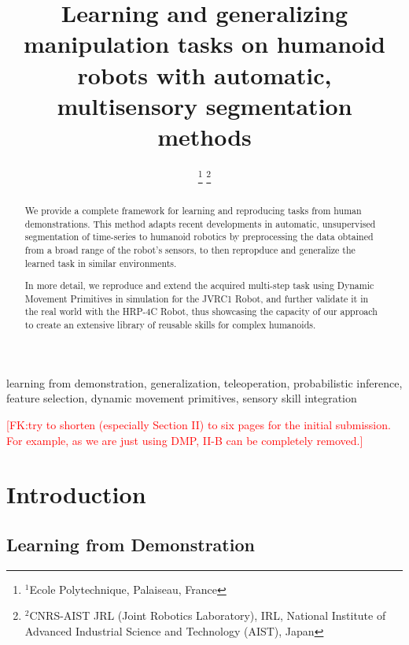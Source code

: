 \documentclass[conference]{IEEEtran}
\newcommand{\fk}[1]{\textcolor{red}{[FK:#1]}}
\begin{document}
\title{\textbf{Learning and generalizing manipulation tasks on humanoid robots with automatic, multisensory segmentation methods}
}

\author{
\IEEEauthorblockA{}
\and
{}
\IEEEauthorblockA{}
\thanks{$^{1}$Ecole Polytechnique, Palaiseau, France}
\thanks{$^{2}$CNRS-AIST JRL (Joint Robotics Laboratory), IRL, National Institute of Advanced Industrial Science and Technology (AIST), Japan}
}

\maketitle

\begin{abstract}
We provide a complete framework for learning and reproducing tasks from human demonstrations. This method adapts recent developments in automatic, unsupervised segmentation of time-series to humanoid robotics by preprocessing the data obtained from a broad range of the robot's sensors, to then repropduce and generalize the learned task in similar environments.

In more detail,  we reproduce and extend the acquired multi-step task using Dynamic Movement Primitives in simulation for the JVRC1 Robot, and further validate it in the real world with the HRP-4C Robot, thus showcasing the capacity of our approach to create an extensive library of reusable skills for complex humanoids.
\end{abstract}

\begin{IEEEkeywords}
learning from demonstration, generalization, teleoperation, probabilistic inference, feature selection, dynamic movement primitives, sensory skill integration
\end{IEEEkeywords}

\fk{try to shorten (especially Section II) to six pages for the initial submission. For example, as we are just using DMP, II-B can be completely removed.}
\section{Introduction}
\subsection{Learning from Demonstration}
\end{document}
